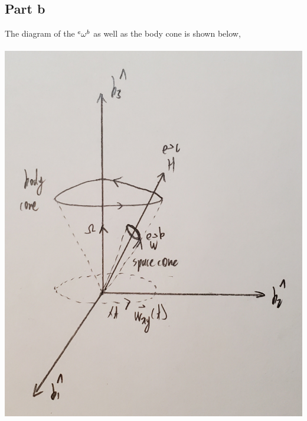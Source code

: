 \documentclass[class=report, 12pt, crop=false]{standalone}
\def\sizes{0.15}
\begin{document}
\begin{center}
\subsection{Part b}
The diagram of the ${}^{e}\omega^{b}$ as well as the body cone is shown below,
\\~\\\includegraphics[scale=\sizes]{Bajingan}

\end{center}
\end{document}
